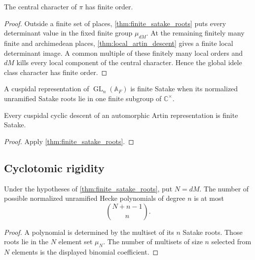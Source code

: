 \documentclass{aomart}
\theoremstyle{definition}
\theoremstyle{remark}
\newcommand{\CC}{\mathbb C}
\newcommand{\Adele}{\mathbb A}
\newcommand{\GL}{\operatorname{GL}}
\begin{document}
\begin{corollary}\label{cor:finite_central_char}
The central character of \(\pi\) has finite order.
\end{corollary}

\begin{proof}
Outside a finite set of places, \cref{thm:finite_satake_roots} puts every determinant value in the fixed finite group \(\mu_{dM}\). At the remaining finitely many finite and archimedean places, \cref{thm:local_artin_descent} gives a finite local determinant image. A common multiple of these finitely many local orders and \(dM\) kills every local component of the central character. Hence the global idele class character has finite order.
\end{proof}

\begin{definition}\label{def:finite_satake_cusp}
A cuspidal representation of \(\GL_n(\Adele_F)\) is finite Satake when its normalized unramified Satake roots lie in one finite subgroup of \(\CC^\times\).
\end{definition}

\begin{corollary}\label{cor:cyclic_finite_satake}
Every cuspidal cyclic descent of an automorphic Artin representation is finite Satake.
\end{corollary}

\begin{proof}
Apply \cref{thm:finite_satake_roots}.
\end{proof}


\subsection{Cyclotomic rigidity}

\begin{proposition}\label{prop:finite_number_hecke}
Under the hypotheses of \cref{thm:finite_satake_roots}, put \(N=dM\). The number of possible normalized unramified Hecke polynomials of degree \(n\) is at most
\[
 \boxed{
 \binom{N+n-1}{n}.
 }
\]
\end{proposition}

\begin{proof}
A polynomial is determined by the multiset of its \(n\) Satake roots. Those roots lie in the \(N\) element set \(\mu_N\). The number of multisets of size \(n\) selected from \(N\) elements is the displayed binomial coefficient.
\end{proof}
\end{document}
